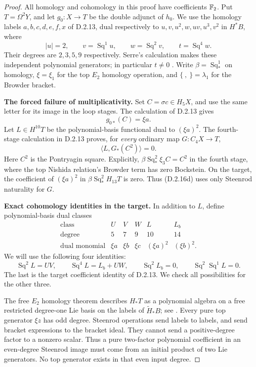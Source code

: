 \begin{proof}
All homology and cohomology in this proof have coefficients $\mathbb F_2$.
Put $T=\Omega^2Y$, and let $g_0:X\to T$ be the double adjunct of
$h_0$. We use the homology labels $a,b,c,d,e,f,x$ of D.2.13,
dual respectively to $u,v,u^2,w,uv,u^3,v^2$ in
$H^*B$, where
\[
 |u|=2,\qquad v=\operatorname{Sq}^1u,\qquad
 w=\operatorname{Sq}^2v,\qquad t=\operatorname{Sq}^4w.
 \tag{D.2.16b}
\]
Their degrees are $2,3,5,9$ respectively. Serre's calculation
makes these independent polynomial generators; in particular
$t\ne0$ \cite[\S2, nos.~8--9, pp.~203--204]{I_Serre1953}.
Write $\beta=\operatorname{Sq}_*^1$ on homology,
$\xi=\xi_1$ for the top $E_2$ homology operation, and
$\{\ ,\ \}=\lambda_1$ for the Browder bracket.

\medskip\noindent
\textbf{The forced failure of multiplicativity.}
Set $C=\sigma c\in H_5X$, and use the same letter for its image
in the loop stages. The calculation of D.2.13 gives
\[
 g_{0*}(C)=\xi a.
 \tag{D.2.16c}
\]
Let $L\in H^{10}T$ be the polynomial-basis functional dual to
$(\xi a)^2$. The fourth-stage calculation in D.2.13 proves, for
\emph{every} ordinary map $G:C_4X\to T$,
\[
 \langle L,G_*(C^2)\rangle=0.
 \tag{D.2.16d}
\]
Here $C^2$ is the Pontryagin square. Explicitly,
$\beta\operatorname{Sq}_*^2\xi_3C=C^2$ in the fourth stage,
where the top Nishida relation's Browder term has zero
Bockstein. On the target, the coefficient of $(\xi a)^2$ in
$\beta\operatorname{Sq}_*^2H_{13}T$ is zero. Thus
\textup{(D.2.16d)} uses only Steenrod naturality for $G$.

\medskip\noindent
\textbf{Exact cohomology identities in the target.}
In addition to $L$, define polynomial-basis dual classes
\[
\begin{array}{c|ccccc}
\text{class}&U&V&W&L&L_b\\
\text{degree}&5&7&9&10&14\\
\text{dual monomial}&\xi a&\xi b&\xi c&(\xi a)^2&(\xi b)^2.
\end{array}
 \tag{D.2.16e}
\]
We will use the following four identities:
\[
 \operatorname{Sq}^2L=UV,\qquad
 \operatorname{Sq}^4L=L_b+UW,\qquad
 \operatorname{Sq}^2L_b=0,\qquad
 \operatorname{Sq}^2\operatorname{Sq}^1L=0.
 \tag{D.2.16f}
\]
The last is the target coefficient identity of D.2.13. We check
all possibilities for the other three.

The free $E_2$ homology theorem describes $H_*T$ as a polynomial
algebra on a free restricted degree-one Lie basis on the labels
of $\widetilde H_*B$; see
\cite[Chapter III, Theorems~3.1--3.2 and Lemma~3.8]{I_CohenLadaMay1976}.
Every pure top generator $\xi z$ has odd degree. Steenrod
operations send labels to labels, and send bracket expressions
to the bracket ideal. They cannot send a positive-degree
factor to a nonzero scalar. Thus a pure two-factor polynomial
coefficient in an even-degree Steenrod image must come from an
initial product of two Lie generators. No top generator exists
in that even input degree.


\end{proof}
